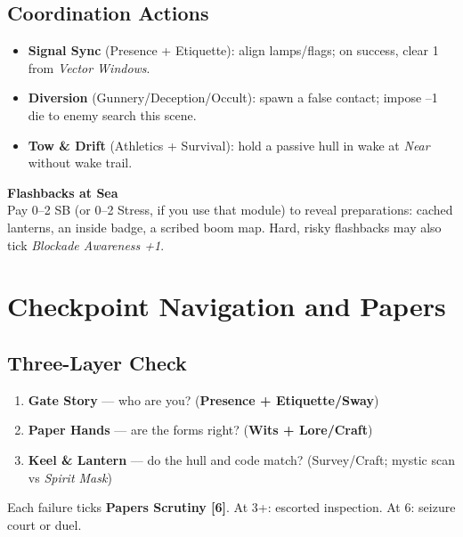\documentclass[11pt,oneside]{book}
\begin{document}
\subsection*{Coordination Actions}
\begin{itemize}
  \item \textbf{Signal Sync} (Presence + Etiquette): align lamps/flags; on success, clear 1 from \emph{Vector Windows}.
  \item \textbf{Diversion} (Gunnery/Deception/Occult): spawn a false contact; impose --1 die to enemy search this scene.
  \item \textbf{Tow \& Drift} (Athletics + Survival): hold a passive hull in wake at \emph{Near} without wake trail.
\end{itemize}

\begin{tcolorbox}[breakable]
\textbf{Flashbacks at Sea}\\
Pay 0--2 SB (or 0--2 Stress, if you use that module) to reveal preparations: cached lanterns, an inside badge, a scribed boom map. Hard, risky flashbacks may also tick \emph{Blockade Awareness +1}.
\end{tcolorbox}

\section{Checkpoint Navigation and Papers}

\subsection*{Three-Layer Check}
\begin{enumerate}[leftmargin=*,itemsep=2pt]
  \item \textbf{Gate Story} --- who are you? (\textbf{Presence + Etiquette/Sway})
  \item \textbf{Paper Hands} --- are the forms right? (\textbf{Wits + Lore/Craft})
  \item \textbf{Keel & Lantern} --- do the hull and code match? (Survey/Craft; mystic scan vs \emph{Spirit Mask})
\end{enumerate}
Each failure ticks \textbf{Papers Scrutiny [6]}. At 3+: escorted inspection. At 6: seizure court or duel.
\end{document}
